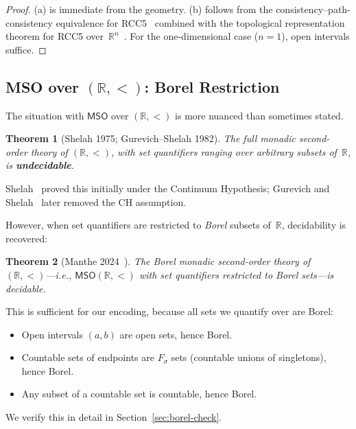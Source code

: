 \documentclass[a4paper,11pt]{article}
\newtheorem{theorem}{Theorem}[section]
\theoremstyle{definition}
\newcommand{\MSO}{\ensuremath{\mathsf{MSO}}}
\newcommand{\reals}{\ensuremath{\mathbb{R}}}
\begin{document}
\begin{proof}
(a) is immediate from the geometry.  (b) follows from the
consistency--path-consistency equivalence for
RCC5~\cite{RenzNebel1999} combined with the topological
representation theorem for RCC5 over~$\reals^n$~\cite{Renz1999}.
For the one-dimensional case ($n=1$), open intervals suffice.
\end{proof}

\subsection{MSO over $(\reals, <)$: Borel Restriction}
\label{sec:mso}

The situation with $\MSO$ over $(\reals, <)$ is more nuanced than
sometimes stated.

\begin{theorem}[Shelah 1975; Gurevich--Shelah 1982]
\label{thm:shelah-full}
The \emph{full} monadic second-order theory of $(\reals, <)$, with
set quantifiers ranging over arbitrary subsets of~$\reals$, is
\textbf{undecidable}.
\end{theorem}

\noindent
Shelah~\cite{Shelah1975} proved this initially under the Continuum
Hypothesis; Gurevich and Shelah~\cite{GurevichShelah1982} later
removed the CH assumption.

However, when set quantifiers are restricted to \emph{Borel} subsets
of~$\reals$, decidability is recovered:

\begin{theorem}[Manthe 2024~\cite{Manthe2024}]
\label{thm:borel-mso}
The \emph{Borel} monadic second-order theory of $(\reals, <)$---i.e.,
$\MSO(\reals, <)$ with set quantifiers restricted to Borel
sets---is decidable.
\end{theorem}

\noindent
This is sufficient for our encoding, because all sets we quantify
over are Borel:
\begin{itemize}[nosep]
  \item Open intervals $(a,b)$ are open sets, hence Borel.
  \item Countable sets of endpoints are $F_\sigma$ sets (countable
    unions of singletons), hence Borel.
  \item Any subset of a countable set is countable, hence Borel.
\end{itemize}
We verify this in detail in Section~\ref{sec:borel-check}.

\end{document}
